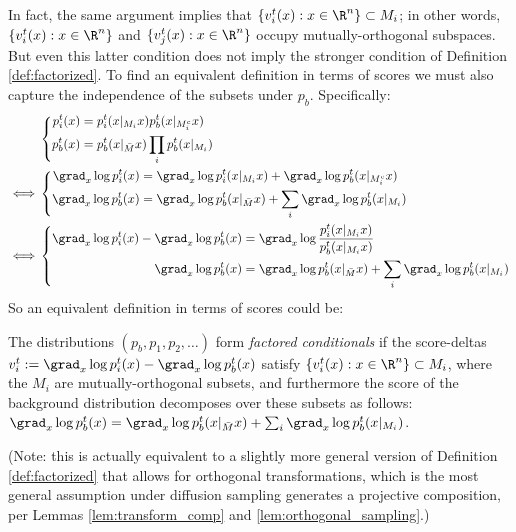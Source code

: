 In fact, the same argument implies that $\{v_i^t(x): x \in \R^n\} \subset M_i$; in other words, $\{v_i^t(x): x \in \R^n\}$ and $\{v_j^t(x): x \in \R^n\}$ occupy mutually-orthogonal subspaces. But even this latter condition does not imply the stronger condition of Definition \ref{def:factorized}. To find an equivalent definition in terms of scores we must also capture the independence of the subsets under $p_b$. Specifically:
\begin{align*}
&\left\{
    \begin{aligned}
    p_i^t(x) &= p_i^t(x|_{M_i} x) p_b^t(x|_{M_i^c} x) \\
    p_b^t(x) &= p_b^t(x|_{\bar M} x) \prod_i p_b^t(x|_{M_i})                   
    \end{aligned}
\right. \\
\iff 
&\left\{
    \begin{aligned}
     \grad_x \log p_i^t(x) &= \grad_x \log p_i^t(x|_{M_i} x) + \grad_x \log p_b^t(x|_{M_i^c} x) \\
    \grad_x \log p_b^t(x) &= \grad_x \log p_b^t(x|_{\bar M} x) + \sum_i \grad_x \log p_b^t(x|_{M_i})
    \end{aligned}
\right. \\
\iff 
&\left\{
    \begin{aligned}
     \grad_x \log p_i^t(x) - \grad_x \log p_b^t(x) 
     &= \grad_x \log \frac{p_i^t(x|_{M_i} x)}{p_b^t(x|_{M_i} x)} \\
    \grad_x \log p_b^t(x) &= \grad_x \log p_b^t(x|_{\bar M} x) + \sum_i \grad_x \log p_b^t(x|_{M_i})
    \end{aligned}
\right.
\end{align*}
So an equivalent definition in terms of scores could be:
\begin{definition}
    The distributions $(p_b, p_1, p_2, \ldots)$ form \emph{factored conditionals} if the score-deltas $v_i^t := \grad_x \log p_i^t(x) - \grad_x \log p_b^t(x)$ satisfy $\{v_i^t(x): x \in \R^n\} \subset M_i$, where the $M_i$ are mutually-orthogonal subsets, and furthermore the score of the background distribution decomposes over these subsets as follows:
    $\grad_x \log p_b^t(x) = \grad_x \log p_b^t(x|_{\bar M} x) + \sum_i \grad_x \log p_b^t(x|_{M_i})$.
\end{definition}
(Note: this is actually equivalent to a slightly more general version of Definition \ref{def:factorized} that allows for orthogonal transformations, which is the most general assumption under diffusion sampling generates a projective composition, per Lemmas \ref{lem:transform_comp} and \ref{lem:orthogonal_sampling}.)
